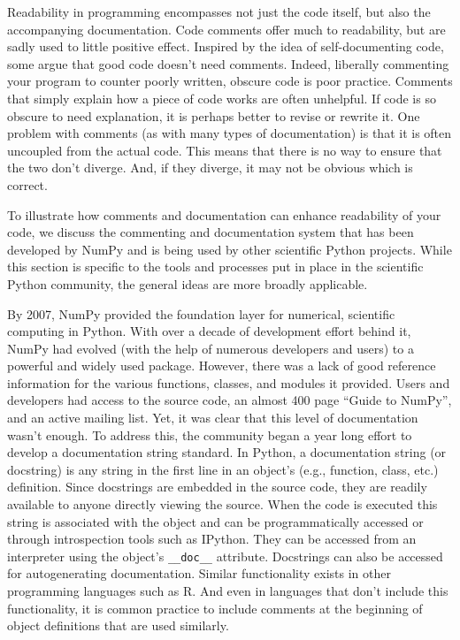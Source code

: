 \documentclass[ChapterTOCs,krantz2]{krantz} %
\begin{document}
Readability in programming encompasses not just the code itself, but also the
accompanying documentation. Code comments offer much to readability, but are
sadly used to little positive effect. Inspired by the idea of self-documenting
code, some argue that good code doesn't need comments. Indeed, liberally
commenting your program to counter poorly written, obscure code is poor
practice. Comments that simply explain how a piece of code works are often
unhelpful. If code is so obscure to need explanation, it is perhaps better to
revise or rewrite it. One problem with comments (as with many types of
documentation) is that it is often uncoupled from the actual code. This means
that there is no way to ensure that the two don't diverge.  And, if they
diverge, it may not be obvious which is correct.

To illustrate how comments and documentation can enhance readability of your
code, we discuss the commenting and documentation system that has been
developed by NumPy and is being used by other scientific Python projects. While
this section is specific to the tools and processes put in place in the
scientific Python community, the general ideas are more broadly applicable.

By 2007, NumPy provided the foundation layer for numerical, scientific
computing in Python. With over a decade of development effort behind it, NumPy
had evolved (with the help of numerous developers and users) to a powerful and
widely used package. However, there was a lack of good reference information
for the various functions, classes, and modules it provided. Users and
developers had access to the source code, an almost 400 page ``Guide to
NumPy'', and an active mailing list. Yet, it was clear that this level of
documentation wasn't enough. To address this, the community began a year long
effort to develop a documentation string standard. In Python, a documentation
string (or docstring) is any string in the first line in an object's (e.g.,
function, class, etc.) definition. Since docstrings are embedded in the source
code, they are readily available to anyone directly viewing the source. When
the code is executed this string is associated with the object and can be
programmatically accessed or through introspection tools such as IPython.  They
can be accessed from an interpreter using the object's \texttt{\_\_doc\_\_}
attribute.  Docstrings can also be accessed for autogenerating documentation.
Similar functionality exists in other programming languages such as R. And even
in languages that don't include this functionality, it is common practice to
include comments at the beginning of object definitions that are used
similarly.
\end{document}
